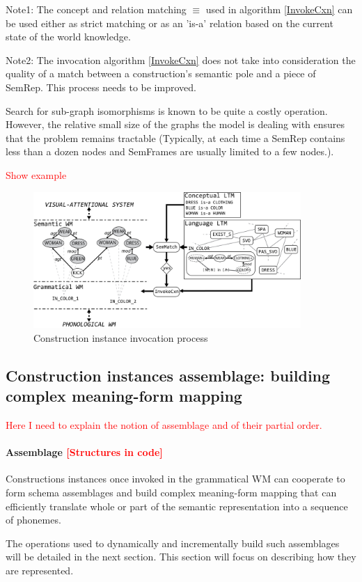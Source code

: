 \documentclass{article}
\newcommand\todo[1]{\textcolor{red}{#1}}
\begin{document}
Note1: The concept and relation matching $\equiv$ used in algorithm \ref{InvokeCxn} can be used either as strict matching or as an 'is-a' relation based on the current state of the world knowledge.

Note2: The invocation algorithm \ref{InvokeCxn} does not take into consideration the quality of a match between a construction's semantic pole and a piece of SemRep. This process needs to be improved.

Search for sub-graph isomorphisms is known to be quite a costly operation. However, the relative small size  of the graphs the model is dealing with ensures that the problem remains tractable (Typically, at each time a SemRep contains less than a dozen nodes and SemFrames are usually limited to a few nodes.).

\todo{Show example}
\begin{figure}[H]
	\centering
	\includegraphics[width=4.0in]{Figures/SemMatch_Invoke.png}
	\caption{Construction instance invocation process}
	\label{fig:semmatch_invoke}
\end{figure}

\subsection{Construction instances assemblage: building complex meaning-form mapping}
\todo{Here I need to explain the notion  of assemblage and of their partial order.}

\paragraph{Assemblage \todo{[Structures in code]}}
Constructions instances once invoked in the grammatical WM can cooperate to form schema assemblages and build complex meaning-form mapping that can efficiently translate whole or part of the semantic representation into a sequence of phonemes.

The operations used to dynamically and incrementally build such assemblages will be detailed in the next section. This section will focus on describing how they are represented.
\end{document}
